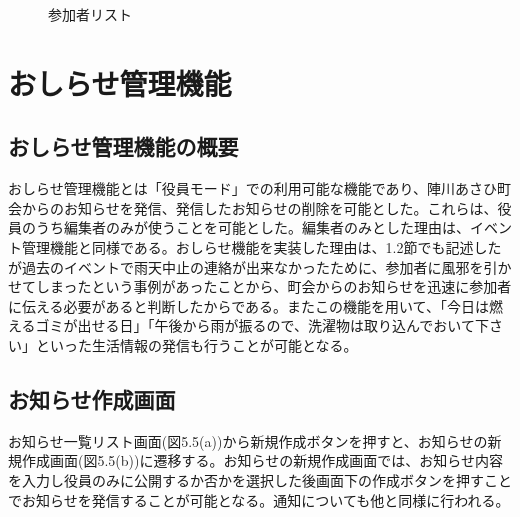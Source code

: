 \begin{figure}[htbp]
\begin{center}
\begin{tabular}{c}
    \end{tabular}
    \caption{参加者リスト}
    \label{fig:lena}
  \end{center}
\end{figure}

\section{おしらせ管理機能}%
\subsection{おしらせ管理機能の概要}%
おしらせ管理機能とは「役員モード」での利用可能な機能であり、陣川あさひ町会からのお知らせを発信、発信したお知らせの削除を可能とした。これらは、役員のうち編集者のみが使うことを可能とした。編集者のみとした理由は、イベント管理機能と同様である。おしらせ機能を実装した理由は、1.2節でも記述したが過去のイベントで雨天中止の連絡が出来なかったために、参加者に風邪を引かせてしまったという事例があったことから、町会からのお知らせを迅速に参加者に伝える必要があると判断したからである。またこの機能を用いて、「今日は燃えるゴミが出せる日」「午後から雨が振るので、洗濯物は取り込んでおいて下さい」といった生活情報の発信も行うことが可能となる。


\subsection{お知らせ作成画面}%
お知らせ一覧リスト画面(図5.5(a))から新規作成ボタンを押すと、お知らせの新規作成画面(図5.5(b))に遷移する。お知らせの新規作成画面では、お知らせ内容を入力し役員のみに公開するか否かを選択した後画面下の作成ボタンを押すことでお知らせを発信することが可能となる。通知についても他と同様に行われる。

